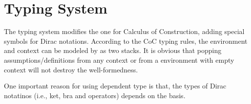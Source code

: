 \documentclass{article}
\newcommand{\yx}[1]{\textit{\color{blue}[YX] : #1}}
\begin{document}






\clearpage
\section{Typing System}
The typing system modifies the one for Calculus of Construction, adding special symbols for Dirac notations.
According to the CoC typing rules, the environment and context can be modeled by as two stacks. It is obvious that popping assumptions/definitions from any context or from a environment with empty context will not destroy the well-formedness.

One important reason for using dependent type is that, the types of Dirac notatinos (i.e., ket, bra and operators) depends on the basis.

\newcommand{\reduce}{\triangleright}

\newcommand{\SORT}{\mathsf{Sort}}
\newcommand{\WF}{\mathcal{WF}}
\newcommand{\Type}{\mathsf{Type}}
\newcommand{\BaseS}{\mathsf{Base}}


\newcommand{\SType}{\mathcal{S}}
\newcommand{\KType}{\mathcal{K}}
\newcommand{\BType}{\mathcal{B}}
\newcommand{\OType}{\mathcal{O}}

\newcommand{\ZEROK}{\mathbf{0}_\mathcal{K}}
\newcommand{\ZEROB}{\mathbf{0}_\mathcal{B}}
\newcommand{\ZEROO}{\mathbf{0}_\mathcal{O}}
\newcommand{\ONEO}{\mathbf{1}_\mathcal{O}}
\end{document}
